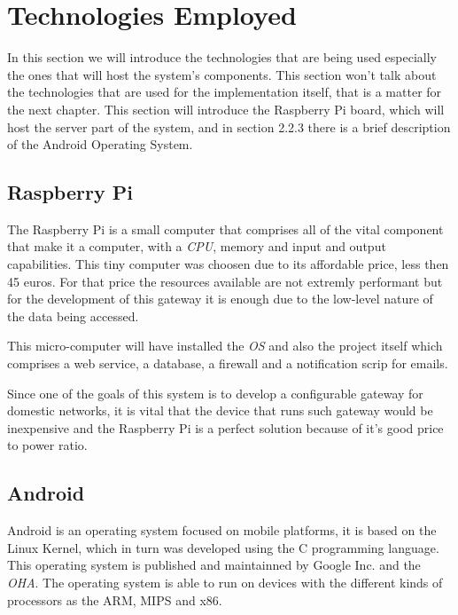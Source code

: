 
\section{Technologies Employed}
\label{chap2:sec:tech}
In this section we will introduce the technologies that are being used
especially the ones that will host the system's components. This section won't
talk about the technologies that are used for the implementation itself, that is
a matter for the next chapter. This section will introduce the Raspberry Pi
board, which will host the server part of the system, and in section 2.2.3 there
is a brief description of the Android Operating System.

\subsection{Raspberry Pi}
\label{chap2:sec:tech:rasp}
The Raspberry Pi is a small computer that comprises all of the vital component
that make it a computer, with a \emph{\ac{CPU}}, memory and input and output
capabilities.
This tiny computer was choosen due to its affordable price, less then 45 euros.
For that price the resources available are not extremly performant but for the
development of this gateway it is enough due to the low-level nature of the data
being accessed.

This micro-computer will have installed the \emph{\ac{OS}} and also the
project itself which comprises a web service, a database, a firewall and a
notification scrip for emails.

Since one of the goals of this system is to develop a configurable gateway for
domestic networks, it is vital that the device that runs such gateway would be
inexpensive and the Raspberry Pi is a perfect solution because of it's good
price to power ratio.

\subsection{Android}
\label{chap2:sec:tech:android}
Android is an operating system focused on mobile platforms, it is based on the
Linux Kernel, which in turn was developed using the C programming language. This
operating system is published and maintainned by Google Inc. and the
\emph{\ac{OHA}}. The operating system is able to run on devices with the
different kinds of processors as the ARM, MIPS and x86.

